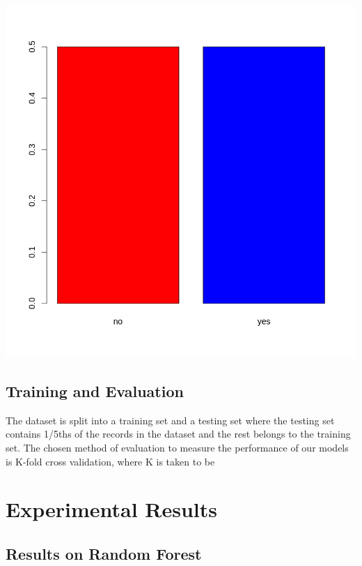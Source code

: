 \documentclass[
]{article}
\let\origfigure\figure
\let\endorigfigure\endfigure
\renewenvironment{figure}[1][2] {
    \expandafter\origfigure\expandafter[H]
} {
    \endorigfigure
}
\begin{document}
\begin{figure}
\centering
\includegraphics{./imgs/class_balance.png}
\caption{Distribution of class percentage after under-sampling}
\end{figure}

\hypertarget{training-and-evaluation}{%
\subsection{Training and Evaluation}\label{training-and-evaluation}}

The dataset is split into a training set and a testing set where the
testing set contains 1/5ths of the records in the dataset and the rest
belongs to the training set. The chosen method of evaluation to measure
the performance of our models is K-fold cross validation, where K is
taken to be

\hypertarget{experimental-results}{%
\section{Experimental Results}\label{experimental-results}}

\hypertarget{results-on-random-forest}{%
\subsection{Results on Random Forest}\label{results-on-random-forest}}
\end{document}

